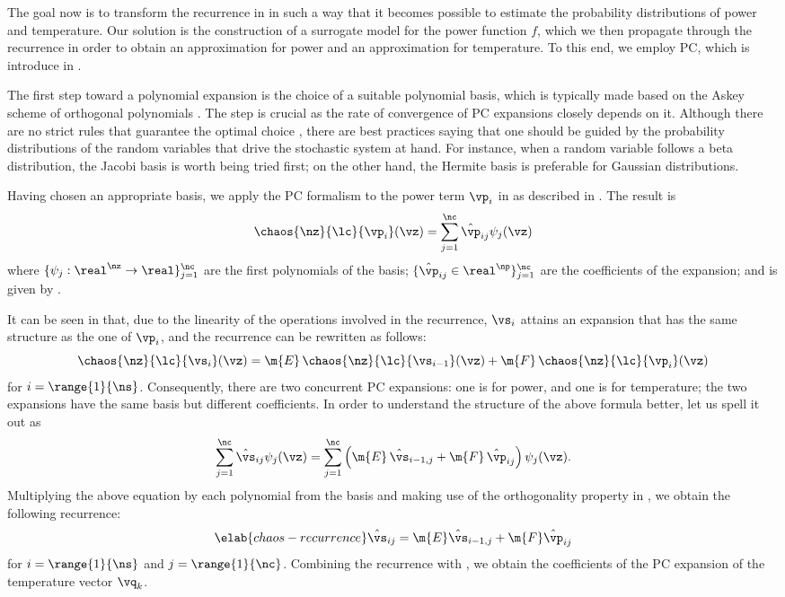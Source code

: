 The goal now is to transform the recurrence in 
in such a way that it becomes possible to estimate the probability distributions
of power and temperature. Our solution is the construction of a surrogate model
for the power function $f$, which we then propagate through the recurrence in
order to obtain an approximation for power and an approximation for temperature.
To this end, we employ \ac{PC}, which is introduce in .

The first step toward a polynomial expansion is the choice of a suitable
polynomial basis, which is typically made based on the Askey scheme of
orthogonal polynomials \cite{xiu2010}. The step is crucial as the rate of
convergence of \ac{PC} expansions closely depends on it. Although there are no
strict rules that guarantee the optimal choice \cite{knio2006}, there are best
practices saying that one should be guided by the probability distributions of
the random variables that drive the stochastic system at hand. For instance,
when a random variable follows a beta distribution, the Jacobi basis is worth
being tried first; on the other hand, the Hermite basis is preferable for
Gaussian distributions.

Having chosen an appropriate basis, we apply the \ac{PC} formalism to the power
term $\vp_i$ in  as described in
. The result is
\[
  \chaos{\nz}{\lc}{\vp_i}(\vz) = \sum_{j = 1}^\nc \hat{\vp}_{ij} \psi_j(\vz)
\]
where $\{ \psi_j: \real^\nz \to \real \}_{j = 1}^\nc$ are the first \nc
polynomials of the basis; $\{ \hat{\vp}_{ij} \in \real^\np \}_{j = 1}^\nc$ are
the coefficients of the expansion; and \nc is given by
.

It can be seen in  that, due to the linearity of
the operations involved in the recurrence, $\vs_i$ attains an expansion that has
the same structure as the one of $\vp_i$, and the recurrence can be rewritten as
follows:
\[
  \chaos{\nz}{\lc}{\vs_i}(\vz) = \m{E} \, \chaos{\nz}{\lc}{\vs_{i - 1}}(\vz) + \m{F} \, \chaos{\nz}{\lc}{\vp_i}(\vz)
\]
for $i = \range{1}{\ns}$. Consequently, there are two concurrent \ac{PC}
expansions: one is for power, and one is for temperature; the two expansions
have the same basis but different coefficients. In order to understand the
structure of the above formula better, let us spell it out as
\[
  \sum_{j = 1}^\nc \hat{\vs}_{ij} \psi_j(\vz) =
  \sum_{j = 1}^\nc \left( \m{E} \, \hat{\vs}_{i - 1, j} + \m{F} \, \hat{\vp}_{ij} \right) \psi_j(\vz).
\]
Multiplying the above equation by each polynomial from the basis and making use
of the orthogonality property in , we obtain the
following recurrence:
\begin{equation} \elab{chaos-recurrence}
  \hat{\vs}_{ij} = \m{E} \hat{\vs}_{i - 1, j} + \m{F} \hat{\vp}_{ij}
\end{equation}
for $i = \range{1}{\ns}$ and $j = \range{1}{\nc}$. Combining the recurrence with
, we obtain the coefficients of the \ac{PC}
expansion of the temperature vector $\vq_k$.

